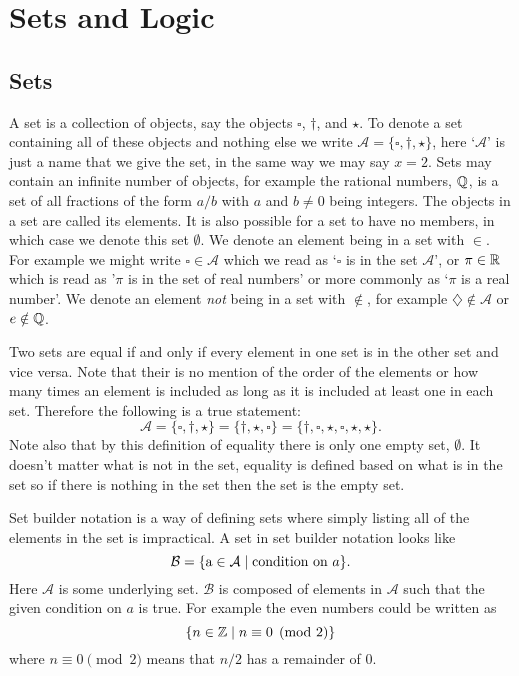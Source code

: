         \section{Sets and Logic}
        \subsection{Sets}
        A set is a collection of objects, say the objects \(\square\), \(\dagger\), and \(\star\).
        To denote a set containing all of these objects and nothing else we write \(\mathcal{A} = \{\square, \dagger, \star\}\), here `\(\mathcal{A}\)' is just a name that we give the set, in the same way we may say \(x = 2\).
        Sets may contain an infinite number of objects, for example the rational numbers, \(\mathbb{Q}\), is a set of all fractions of the form \(a/b\) with \(a\) and \(b \ne 0\) being integers.
        The objects in a set are called its elements.
        It is also possible for a set to have no members, in which case we denote this set \(\emptyset\).
        We denote an element being in a set with \(\in\).
        For example we might write \(\square \in \mathcal{A}\) which we read as `\(\square\) is in the set \(\mathcal{A}\)', or \(\pi \in \mathbb{R}\) which is read as '\(\pi\) is in the set of real numbers' or more commonly as `\(\pi\) is a real number'.
        We denote an element \emph{not} being in a set with \(\notin\), for example \(\diamondsuit \notin \mathcal{A}\) or \(e\notin\mathbb{Q}\).
        
        Two sets are equal if and only if every element in one set is in the other set and vice versa.
        Note that their is no mention of the order of the elements or how many times an element is included as long as it is included at least one in each set.
        Therefore the following is a true statement:
        \[\mathcal{A} = \{\square, \dagger, \star\} = \{\dagger, \star, \square\} = \{\dagger, \square, \star, \square, \star, \star\}.\]
        Note also that by this definition of equality there is only one empty set, \(\emptyset\).
        It doesn't matter what is not in the set, equality is defined based on what is in the set so if there is nothing in the set then the set is the empty set.
        
        Set builder notation is a way of defining sets where simply listing all of the elements in the set is impractical.
        A set in set builder notation looks like
        \[\mathcal{B} = \{\text{a} \in \mathcal{A} \mid \text{condition on }a\}.\]
        Here \(\mathcal{A}\) is some underlying set.
        \(\mathcal{B}\) is composed of elements in \(\mathcal{A}\) such that the given condition on \(a\) is true.
        For example the even numbers could be written as
        \[\{n\in\mathbb{Z} \mid n\equiv 0\pmod{2}\}\]
        where \(n \equiv 0 \pmod{2}\) means that \(n/2\) has a remainder of 0.
        

